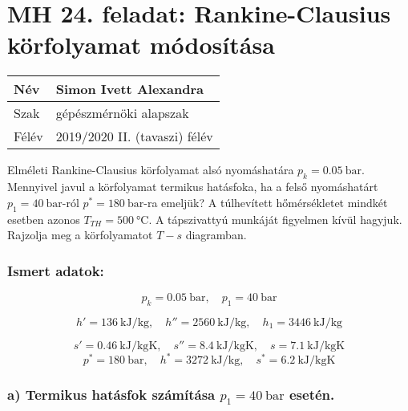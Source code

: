 
\section*{MH 24. feladat: Rankine-Clausius körfolyamat módosítása}

\begin{tabular}{ | p{2cm} | p{14cm} | } 
	\hline
	Név & Simon Ivett Alexandra \\ 
	\hline
	Szak & gépészmérnöki alapszak \\ 
	\hline
	Félév & 2019/2020 II. (tavaszi) félév \\ 
	\hline
\end{tabular}
\vspace{0.5cm}

Elméleti Rankine-Clausius körfolyamat alsó nyomáshatára $p_k = \SI{0,05}{\bar}$. Mennyivel javul a körfolyamat termikus hatásfoka, ha a felső nyomáshatárt $p_1 = \SI{40}{\bar}$-ról $p^* = \SI{180}{\bar}$-ra emeljük? A túlhevített hőmérsékletet mindkét esetben azonos $T_{TH} = \SI{500}{\celsius}$. A tápszivattyú munkáját figyelmen kívül hagyjuk. Rajzolja meg a körfolyamatot $T-s$ diagramban.

\subsubsection{Ismert adatok:}

\begin{equation*}
	p_k = \SI{0,05}{\bar},
	\quad
	p_1 = \SI{40}{\bar}	
\end{equation*}

\begin{equation*}
	h' = \SI{136}{\kilo\joule\per\kilogram},
	\quad
	h'' = \SI{2560}{\kilo\joule\per\kilogram},
	\quad
	h_1 = \SI{3446}{\kilo\joule\per\kilogram}
\end{equation*}

\begin{equation*}
	s' = \SI{0,46}{\kilo\joule\per\kilogram\kelvin},
	\quad
	s'' = \SI{8,4}{\kilo\joule\per\kilogram\kelvin},
	\quad
	s = \SI{7,1}{\kilo\joule\per\kilogram\kelvin}
\end{equation*}
\begin{equation*}
	p^* = \SI{180}{\bar},
	\quad
	h^* = \SI{3272}{\kilo\joule\per\kilogram},
	\quad
	s^* = \SI{6,2}{\kilo\joule\per\kilogram\kelvin}
\end{equation*}


\subsubsection*{a) Termikus hatásfok számítása $p_1=\SI{40}{\bar}$ esetén.}

